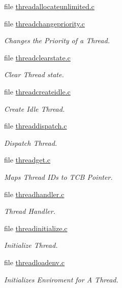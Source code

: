 \begin{DoxyCompactItemize}
file \mbox{\hyperlink{threadallocateunlimited_8c}{threadallocateunlimited.\+c}}
\item 
file \mbox{\hyperlink{threadchangepriority_8c}{threadchangepriority.\+c}}
\begin{DoxyCompactList}\small\item\em Changes the Priority of a Thread. \end{DoxyCompactList}\item 
file \mbox{\hyperlink{threadclearstate_8c}{threadclearstate.\+c}}
\begin{DoxyCompactList}\small\item\em Clear Thread state. \end{DoxyCompactList}\item 
file \mbox{\hyperlink{threadcreateidle_8c}{threadcreateidle.\+c}}
\begin{DoxyCompactList}\small\item\em Create Idle Thread. \end{DoxyCompactList}\item 
file \mbox{\hyperlink{threaddispatch_8c}{threaddispatch.\+c}}
\begin{DoxyCompactList}\small\item\em Dispatch Thread. \end{DoxyCompactList}\item 
file \mbox{\hyperlink{threadget_8c}{threadget.\+c}}
\begin{DoxyCompactList}\small\item\em Maps Thread I\+Ds to T\+CB Pointer. \end{DoxyCompactList}\item 
file \mbox{\hyperlink{threadhandler_8c}{threadhandler.\+c}}
\begin{DoxyCompactList}\small\item\em Thread Handler. \end{DoxyCompactList}\item 
file \mbox{\hyperlink{threadinitialize_8c}{threadinitialize.\+c}}
\begin{DoxyCompactList}\small\item\em Initialize Thread. \end{DoxyCompactList}\item 
file \mbox{\hyperlink{threadloadenv_8c}{threadloadenv.\+c}}
\begin{DoxyCompactList}\small\item\em Initializes Enviroment for A Thread. \end{DoxyCompactList}\item 

\end{DoxyCompactItemize}
